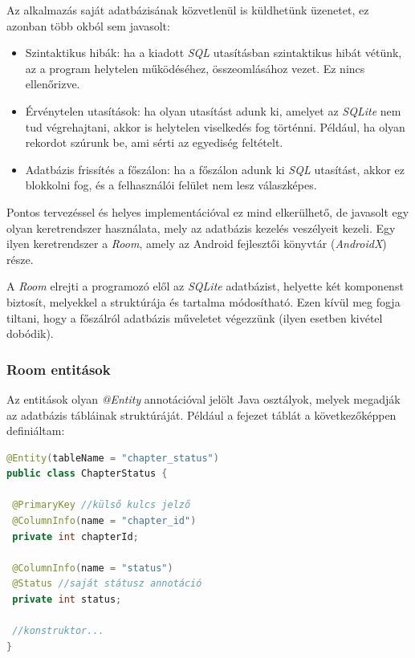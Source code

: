 \documentclass[12pt,a4paper]{article}
\begin{document}
	Az alkalmazás saját adatbázisának közvetlenül is küldhetünk üzenetet, ez azonban több okból sem javasolt:
	
	\begin{itemize}
		\item Szintaktikus hibák: ha a kiadott \textit{SQL} utasításban szintaktikus hibát vétünk, az a program helytelen működéséhez, összeomlásához vezet. Ez nincs ellenőrizve.
		\item Érvénytelen utasítások: ha olyan utasítást adunk ki, amelyet az \textit{SQLite} nem tud végrehajtani, akkor is helytelen viselkedés fog történni. Például, ha olyan rekordot szúrunk be, ami sérti az egyediség feltételt.
		\item Adatbázis frissítés a főszálon: ha a főszálon adunk ki \textit{SQL} utasítást, akkor ez blokkolni fog, és a felhasználói felület nem lesz válaszképes. 
	\end{itemize}

	Pontos tervezéssel és helyes implementációval ez mind elkerülhető, de javasolt egy olyan keretrendszer használata, mely az adatbázis kezelés veszélyeit kezeli. Egy ilyen keretrendszer a \textit{Room}, amely az Android fejlesztői könyvtár (\textit{AndroidX}) része.
	
	A \textit{Room} elrejti a programozó elől az \textit{SQLite} adatbázist, helyette két komponenst biztosít, melyekkel a struktúrája és tartalma módosítható. Ezen kívül meg fogja tiltani, hogy a főszálról adatbázis műveletet végezzünk (ilyen esetben kivétel dobódik). 
	
	\subsubsection{Room entitások}
	
	Az entitások olyan \textit{@Entity} annotációval jelölt Java osztályok, melyek megadják az adatbázis tábláinak struktúráját. Például a fejezet táblát a következőképpen definiáltam:
	
	\begin{lstlisting}[language=Java]
@Entity(tableName = "chapter_status")
public class ChapterStatus {
	
 @PrimaryKey //külső kulcs jelző
 @ColumnInfo(name = "chapter_id")
 private int chapterId;
	
 @ColumnInfo(name = "status")
 @Status //saját státusz annotáció
 private int status;
 
 //konstruktor...
}
	\end{lstlisting}  
	
\end{document}
